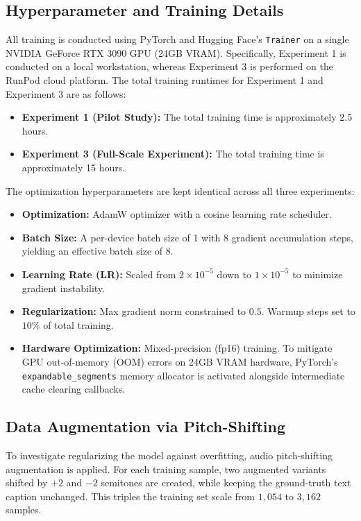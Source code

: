\documentclass[12pt, conference, letterpaper]{IEEEtran}
\begin{document}
\subsection{Hyperparameter and Training Details}
All training is conducted using PyTorch and Hugging Face's \texttt{Trainer} on a single NVIDIA GeForce RTX 3090 GPU (24GB VRAM). Specifically, Experiment 1 is conducted on a local workstation, whereas Experiment 3 is performed on the RunPod cloud platform. The total training runtimes for Experiment 1 and Experiment 3 are as follows:
\begin{itemize}
    \item \textbf{Experiment 1 (Pilot Study):} The total training time is approximately 2.5 hours.
    \item \textbf{Experiment 3 (Full-Scale Experiment):} The total training time is approximately 15 hours.
\end{itemize}
The optimization hyperparameters are kept identical across all three experiments:
\begin{itemize}
    \item \textbf{Optimization:} AdamW optimizer with a cosine learning rate scheduler.
    \item \textbf{Batch Size:} A per-device batch size of 1 with 8 gradient accumulation steps, yielding an effective batch size of 8.
    \item \textbf{Learning Rate (LR):} Scaled from $2\times 10^{-5}$ down to $1\times 10^{-5}$ to minimize gradient instability.
    \item \textbf{Regularization:} Max gradient norm constrained to $0.5$. Warmup steps set to $10\%$ of total training.
    \item \textbf{Hardware Optimization:} Mixed-precision (fp16) training. To mitigate GPU out-of-memory (OOM) errors on 24GB VRAM hardware, PyTorch's \texttt{expandable\_segments} memory allocator is activated alongside intermediate cache clearing callbacks.
\end{itemize}

\subsection{Data Augmentation via Pitch-Shifting}
To investigate regularizing the model against overfitting, audio pitch-shifting augmentation is applied. For each training sample, two augmented variants shifted by $+2$ and $-2$ semitones are created, while keeping the ground-truth text caption unchanged. This triples the training set scale from $1,054$ to $3,162$ samples.
\end{document}

